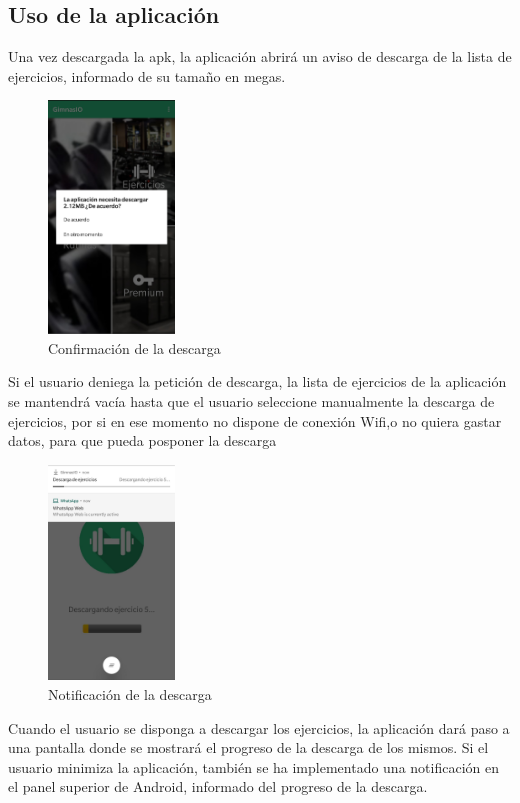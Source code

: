 \documentclass[11pt,a4paper]{report}
\begin{document}
\subsection{Uso de la aplicación}
Una vez descargada la apk, la aplicación abrirá un aviso de descarga de la lista de ejercicios, informado de su tamaño en megas.
\begin{figure}[H]
	\centering
	\includegraphics[width=0.3\textwidth]{graficos/manual/ConfirmacionDescarga.jpg}
	\caption{Confirmación de la descarga}
\end{figure}
Si el usuario deniega la petición de descarga, la lista de ejercicios de la aplicación se mantendrá vacía hasta que el usuario seleccione manualmente la descarga de ejercicios, por si en ese momento no dispone de conexión Wifi,o no quiera gastar datos, para que pueda posponer la descarga
\begin{figure}[H]
	\centering
	\includegraphics[width=0.3\textwidth]{graficos/manual/NotificacionDescarga.jpg}
	\caption{Notificación de la descarga}
\end{figure}
Cuando el usuario se disponga a descargar los ejercicios, la aplicación dará paso a una pantalla donde se mostrará el progreso de la descarga de los mismos. Si el usuario minimiza la aplicación, también se ha implementado una notificación en el panel superior de Android, informado del progreso de la descarga.
\end{document}
